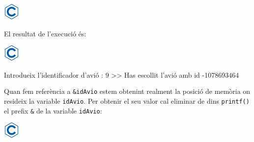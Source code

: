 \documentclass[]{book}
\newenvironment{Shaded}{\begin{snugshade}}{\end{snugshade}}
\newcommand{\DataTypeTok}[1]{\textcolor[rgb]{0.13,0.29,0.53}{#1}}
\newcommand{\DecValTok}[1]{\textcolor[rgb]{0.00,0.00,0.81}{#1}}
\newcommand{\SpecialCharTok}[1]{\textcolor[rgb]{0.00,0.00,0.00}{#1}}
\newcommand{\StringTok}[1]{\textcolor[rgb]{0.31,0.60,0.02}{#1}}
\newcommand{\ImportTok}[1]{#1}
\newcommand{\ControlFlowTok}[1]{\textcolor[rgb]{0.13,0.29,0.53}{\textbf{#1}}}
\newcommand{\PreprocessorTok}[1]{\textcolor[rgb]{0.56,0.35,0.01}{\textit{#1}}}
\newcommand{\NormalTok}[1]{#1}
\begin{document}
\includegraphics{./img/c.png}

\begin{Shaded}
\end{Shaded}

El resultat de l'execució és:

\includegraphics{./img/c.png}

\begin{Shaded}
\begin{Highlighting}[]
\NormalTok{Introdueix l'identificador d'avió : }\DecValTok{9}
\NormalTok{>> Has escollit l'avió amb id -}\DecValTok{1078693464}
\end{Highlighting}
\end{Shaded}

Quan fem referència a \texttt{\&idAvio} estem obtenint realment la
posició de memòria on resideix la variable \texttt{idAvio}. Per obtenir
el seu valor cal eliminar de dins \texttt{printf()} el prefix
\texttt{\&} de la variable \texttt{idAvio}:

\includegraphics{./img/c.png}
\end{document}
